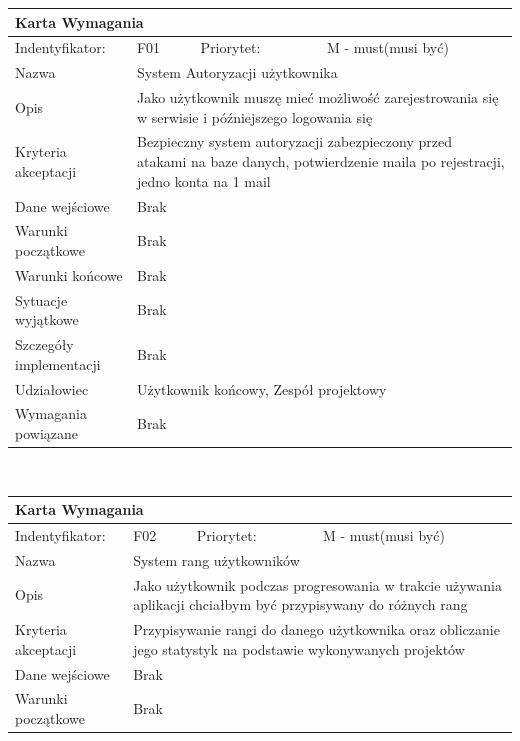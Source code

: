 \documentclass[a4paper,11pt]{report}
\begin{document}
\begin{itemize}
\begin{itemize}
\begin{tabular}{|p{3cm}|p{2cm}|p{2cm}|p{6cm}|}
		\hline
		\multicolumn{4}{|p{12 cm}|}{Karta Wymagania}\\
		\hline
		Indentyfikator: & F01 & Priorytet: & M - must(musi być)\\
		\hline
		Nazwa & \multicolumn{3}{|p{10 cm}|}{System Autoryzacji użytkownika}\\
		\hline
		Opis & \multicolumn{3}{|p{10 cm}|}{Jako użytkownik muszę mieć możliwość zarejestrowania się w serwisie i późniejszego logowania się}\\
		\hline
		Kryteria akceptacji & \multicolumn{3}{|p{10 cm}|}{Bezpieczny system autoryzacji zabezpieczony przed atakami na baze danych, potwierdzenie maila po rejestracji,  jedno konta na 1 mail}\\
		\hline
		Dane wejściowe & \multicolumn{3}{|p{10 cm}|}{Brak}\\
		\hline
		Warunki początkowe & \multicolumn{3}{|p{10 cm}|}{Brak}\\
		\hline
		Warunki końcowe & \multicolumn{3}{|p{10 cm}|}{Brak}\\
		\hline
		Sytuacje wyjątkowe & \multicolumn{3}{|p{10 cm}|}{Brak}\\
		\hline
		Szczegóły implementacji & \multicolumn{3}{|p{10 cm}|}{Brak}\\
		\hline
		Udziałowiec & \multicolumn{3}{|p{10 cm}|}{Użytkownik końcowy, Zespół projektowy}\\
		\hline
		Wymagania powiązane & \multicolumn{3}{|p{10 cm}|}{Brak}\\
		\hline
		\end{tabular}\\
		\begin{tabular}{|p{3cm}|p{2cm}|p{2cm}|p{6cm}|}
		\hline
		\multicolumn{4}{|p{12 cm}|}{Karta Wymagania}\\
		\hline
		Indentyfikator: & F02 & Priorytet: & M - must(musi być)\\
		\hline
		Nazwa & \multicolumn{3}{|p{10 cm}|}{System rang użytkowników}\\
		\hline
		Opis & \multicolumn{3}{|p{10 cm}|}{Jako użytkownik podczas progresowania w trakcie używania aplikacji chciałbym być przypisywany do różnych rang}\\
		\hline
		Kryteria akceptacji & \multicolumn{3}{|p{10 cm}|}{Przypisywanie rangi do danego użytkownika oraz obliczanie jego statystyk na podstawie wykonywanych projektów}\\
		\hline
		Dane wejściowe & \multicolumn{3}{|p{10 cm}|}{Brak}\\
		\hline
		Warunki początkowe & \multicolumn{3}{|p{10 cm}|}{Brak}\\

\end{tabular}
\end{itemize}
\end{itemize}
\end{document}
